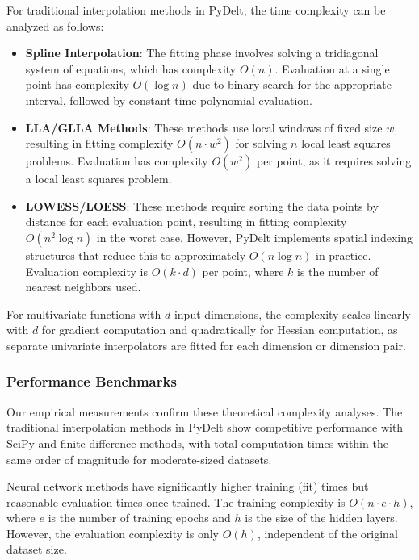 \documentclass[10pt,journal,compsoc]{IEEEtran}
\begin{document}
For traditional interpolation methods in PyDelt, the time complexity can be analyzed as follows:

\begin{itemize}
    \item \textbf{Spline Interpolation}: The fitting phase involves solving a tridiagonal system of equations, which has complexity $O(n)$. Evaluation at a single point has complexity $O(\log n)$ due to binary search for the appropriate interval, followed by constant-time polynomial evaluation.
    
    \item \textbf{LLA/GLLA Methods}: These methods use local windows of fixed size $w$, resulting in fitting complexity $O(n \cdot w^2)$ for solving $n$ local least squares problems. Evaluation has complexity $O(w^2)$ per point, as it requires solving a local least squares problem.
    
    \item \textbf{LOWESS/LOESS}: These methods require sorting the data points by distance for each evaluation point, resulting in fitting complexity $O(n^2 \log n)$ in the worst case. However, PyDelt implements spatial indexing structures that reduce this to approximately $O(n \log n)$ in practice. Evaluation complexity is $O(k \cdot d)$ per point, where $k$ is the number of nearest neighbors used.
\end{itemize}

For multivariate functions with $d$ input dimensions, the complexity scales linearly with $d$ for gradient computation and quadratically for Hessian computation, as separate univariate interpolators are fitted for each dimension or dimension pair.

\subsubsection{Performance Benchmarks}

Our empirical measurements confirm these theoretical complexity analyses. The traditional interpolation methods in PyDelt show competitive performance with SciPy and finite difference methods, with total computation times within the same order of magnitude for moderate-sized datasets.

Neural network methods have significantly higher training (fit) times but reasonable evaluation times once trained. The training complexity is $O(n \cdot e \cdot h)$, where $e$ is the number of training epochs and $h$ is the size of the hidden layers. However, the evaluation complexity is only $O(h)$, independent of the original dataset size.
\end{document}
